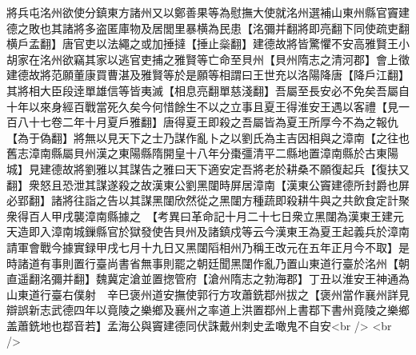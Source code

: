 將兵屯洺州欲使分鎮東方諸州又以鄭善果等為慰撫大使就洺州選補山東州縣官竇建德之敗也其諸將多盗匿庫物及居閭里暴横為民患【洺彌并翻將即亮翻下同使疏吏翻横戶孟翻】唐官吏以法繩之或加捶撻【捶止橤翻】建德故將皆驚懼不安高雅賢王小胡家在洺州欲竊其家以逃官吏捕之雅賢等亡命至貝州【貝州隋志之清河郡】會上徵建德故將范願董康買曹湛及雅賢等於是願等相謂曰王世充以洛陽降唐【降戶江翻】其將相大臣段逹單雄信等皆夷滅【相息亮翻單慈淺翻】吾屬至長安必不免矣吾屬自十年以來身經百戰當死久矣今何惜餘生不以之立事且夏王得淮安王遇以客禮【見一百八十七卷二年十月夏戶雅翻】唐得夏王即殺之吾屬皆為夏王所厚今不為之報仇【為于偽翻】將無以見天下之士乃謀作亂卜之以劉氏為主吉因相與之漳南【之往也舊志漳南縣屬貝州漢之東陽縣隋開皇十八年分棗彊清平二縣地置漳南縣於古東陽城】見建德故將劉雅以其謀告之雅曰天下適安定吾將老於耕桑不願復起兵【復扶又翻】衆怒且恐泄其謀遂殺之故漢東公劉黑闥時屏居漳南【漢東公竇建德所封爵也屏必郢翻】諸將往詣之告以其謀黑闥欣然從之黑闥方種蔬即殺耕牛與之共飲食定計聚衆得百人甲戌襲漳南縣據之　【考異曰革命記十月二十七日衆立黑闥為漢東王建元天造即入漳南城鏁縣官於獄發使告貝州及諸鎮戍等云今漢東王為夏王起義兵於漳南請軍會戰今據實録甲戌七月十九日又黑闥䧟相州乃稱王改元在五年正月今不取】是時諸道有事則置行臺尚書省無事則罷之朝廷聞黑闥作亂乃置山東道行臺於洺州【朝直遥翻洺彌并翻】魏冀定滄並置揔管府【滄州隋志之勃海郡】丁丑以淮安王神通為山東道行臺右僕射　辛巳褒州道安撫使郭行方攻蕭銑鄀州拔之【褒州當作襄州詳見辯誤新志武德四年以竟陵之樂鄉及襄州之率道上洪置鄀州上書鄀下書州竟陵之樂鄉盖蕭銑地也鄀音若】孟海公與竇建德同伏誅戴州刺史孟噉鬼不自安<br />
<br />
